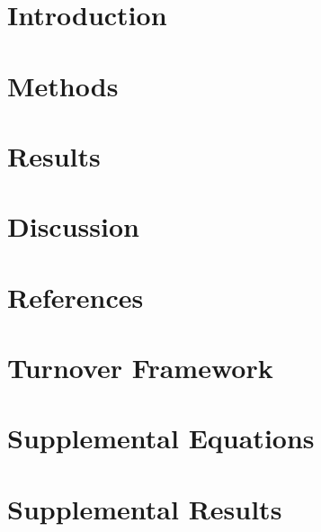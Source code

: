 \documentclass[review,3p,authoryear]{elsarticle}
\begin{document}

\section{Introduction}\label{s:intro}

\section{Methods}\label{s:methods}

\section{Results}\label{s:results}

\section{Discussion}\label{s:discussion}

\clearpage

\clearpage
\section*{References}

\clearpage
\initappendix
\section{Turnover Framework}\label{a:framework}

\clearpage
\section{Supplemental Equations}\label{a:eqs}

\clearpage
\section{Supplemental Results}\label{a:results}

\clearpage
\end{document}
